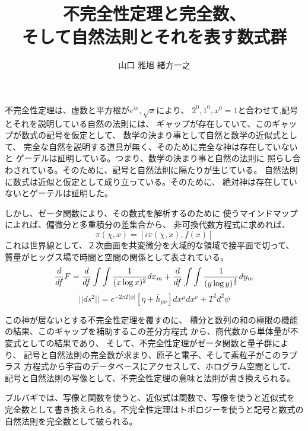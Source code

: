 \documentclass{jsarticle}
\begin{document}
\title{不完全性定理と完全数、\\
そして自然法則とそれを表す数式群}
\author{山口 雅旭   緒方一之}
\date{}
\maketitle

  不完全性定理は、虚数と平方根が$ e^{ix},\sqrt{x} $により、
  $ 2^0,1^0,x^0 = 1 $と合わせて,記号とそれを説明している自然の法則には、
  ギャップが存在していて、このギャップが数式の記号を仮定として、
  数学の決まり事として自然と数学の近似式として、
  完全な自然を説明する道具が無く、そのために完全な神は存在していないと
  ゲーデルは証明している。つまり、数学の決まり事と自然の法則に
  照らし合わされている。そのために、記号と自然法則に隔たりが生じている。
  自然法則に数式は近似と仮定として成り立っている。そのために、
  絶対神は存在していないとゲーテルは証明した。 
 
  しかし、ゼータ関数により、その数式を解析するのために
  使うマインドマップによれば、偏微分と多重積分の差集合から、
  非可換代数方程式に求めれば、
  $$ \pi(\chi,x)  = [i \pi(\chi,x),f(x)] $$
  これは世界線として、２次曲面を共変微分を大域的な領域で接平面で切って、
  質量がヒッグス場で時間と空間の関係として表されている。
  $$ {d \over df}F = {d \over df}\int \int{1 \over (x \log x)^2}dx_m
  + {d \over df}\int \int{1 \over (y \log y)^{1 \over 2}}dy_m $$
  $$ ||ds^2|| = e^{-2 \pi T |\phi|}[\eta + \bar{h}_{\mu\nu}]dx^{\mu}
  dx^{\nu} + T^2 d^2 \psi $$

  この神が居ないとする不完全性定理を覆すのに、
  積分と数列の和の極限の機能の結果、このギャップを補助するこの差分方程式
  から、商代数から単体量が不変式としての結果であり、
  そして、不完全性定理がゼータ関数と量子群により、
  記号と自然法則の完全数が求まり、原子と電子、そして素粒子がこのラプラス
  方程式から宇宙のデータベースにアクセスして、ホログラム空間として、
  記号と自然法則の写像として、不完全性定理の意味と法則が書き換えられる。


  ブルバギでは、写像と関数を使うと、近似式は関数で、写像を使うと近似式を
  完全数として書き換えられる。不完全性定理はトポロジーを使うと記号と数式の
  自然法則を完全数として破られる。
\end{document}
